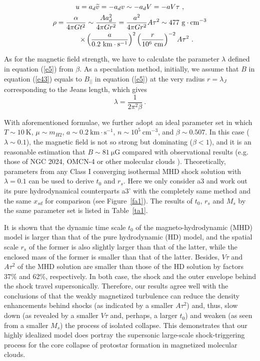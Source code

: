 \documentclass[fleqn,usenatbib]{mnras}
\begin{document}
\begin{gather}
u=a_{d}\widetilde{v}=-a_{d}v\sim -a_{d}V=-aV\tau\ , \label{e47}\\
\rho=\frac{\alpha}{4\pi Gt^{2}}\sim \frac{A a_{d}^{2}}{4\pi Gr^{2}}=\frac{a^{2}}{4\pi Gr^{2}}A\tau^{2}\sim 477~\mathrm{g\cdot cm^{-3}}\notag\\
\qquad\times\left(\frac{a}{0.2~\mathrm{km\cdot s^{-1}}}\right)^{2}\left(\frac{r}{10^{6}~\mathrm{cm}}\right)^{-2}A\tau^{2}\ .\label{e48}
\end{gather} 

As for the magnetic field strength, we have to calculate the parameter $\lambda$ defined in equation (\ref{e5}) from $\beta$. 
As a speculation method, initially, we assume that $B$ in equation (\ref{e43}) equals to $B_{||}$ in equation (\ref{e5}) at the very radius $r=\lambda_{J}$ corresponding to the Jeans length, which gives
\begin{equation}
\lambda=\frac{1}{2\pi^{2}\beta}\ .
\end{equation}

With aforementioned formulae, we further adopt an ideal parameter set in which $T\sim 10~\mathrm{K}$, $\mu\sim m_{H2}$, $a\sim 0.2~\mathrm{km\cdot s^{-1}}$, $n\sim 10^{5}~\mathrm{cm^{-3}}$, and $\beta\sim 0.507$. In this case ($\lambda\sim 0.1$), the magnetic field is not so strong but dominating ($\beta<1$), and it is an reasonable estimation that $B\sim 81~\mathrm{\mu G}$ compared with observational results (e.g. those of NGC 2024, OMCN-4 \citep{crutcher1999magnetic} or other molecular clouds \citep{bourke2001new}). Theoretically, parameters from any Class I converging isothermal MHD shock solution with $\lambda=0.1$ can be used to derive $t_{0}$ and $r_{s}$. Here we only consider a3 and work out its pure hydrodynamical counterparts a3' with the completely same method and the same $x_{sd}$ for comparison (see Figure~\ref{fa1}). The results of $t_{0}$, $r_{s}$ and $M_{s}$ by the same parameter set is listed in Table~\ref{ta1}. 

It is shown that the dynamic time scale $t_{0}$ of the magneto-hydrodynamic (MHD) model is larger than that of the pure hydrodynamic (HD) model, and the spatial scale $r_{s}$ of the former is also slightly larger than that of the latter, while the enclosed mass of the former is smaller than that of the latter. Besides, $V\tau$ and $A\tau^{2}$ of the MHD solution are smaller than those of the HD solution by factors 37\% and 62\%, respectively. In both case, the shock and the outer envelope behind the shock travel supersonically. Therefore, our results agree well with the conclusions of \citet{heitsch2001gravitational} that the weakly magnetized turbulence can reduce the density enhancements behind shocks (as indicated by a smaller $A\tau^{2}$) and, thus, slow down (as revealed by a smaller $V\tau$ and, perhaps, a larger $t_{0}$) and weaken (as seen from a smaller $M_{s}$) the process of isolated collapse. This demonstrates that our highly idealized model does portray the supersonic large-scale shock-triggering process for the core collapse of protostar formation in magnetized molecular clouds.
\end{document}
